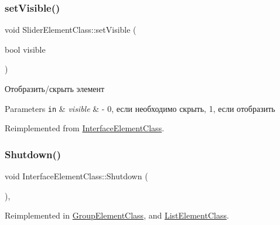 \subsubsection{\texorpdfstring{set\+Visible()}{setVisible()}}
{\footnotesize\ttfamily void Slider\+Element\+Class\+::set\+Visible (\begin{DoxyParamCaption}\item[{bool}]{visible }\end{DoxyParamCaption})\hspace{0.3cm}{\ttfamily [virtual]}}



Отобразить/скрыть элемент 


\begin{DoxyParams}[1]{Parameters}
\mbox{\tt in}  & {\em visible} & -\/ 0, если необходимо скрыть, 1, если отобразить \\
\hline
\end{DoxyParams}


Reimplemented from \hyperlink{class_interface_element_class_ad7981e5bad3db0c073ca1301dee44d6f}{Interface\+Element\+Class}.

\mbox{\label{class_interface_element_class_aa710f6d66c3aa4c2d0a23fdd2b75a1f0}} 
\subsubsection{\texorpdfstring{Shutdown()}{Shutdown()}}
{\footnotesize\ttfamily void Interface\+Element\+Class\+::\+Shutdown (\begin{DoxyParamCaption}{ }\end{DoxyParamCaption})\hspace{0.3cm}{\ttfamily [virtual]}, {\ttfamily [inherited]}}



Reimplemented in \hyperlink{class_group_element_class_add2c48701e28e7a05fbb0e5aa14e58a3}{Group\+Element\+Class}, and \hyperlink{class_list_element_class_a7238c462dd3783162f5ccf213b9f55f1}{List\+Element\+Class}.

\mbox{\label{class_interface_element_class_a4eabfb2943783e107dfe0aaa6a08da62}} 
